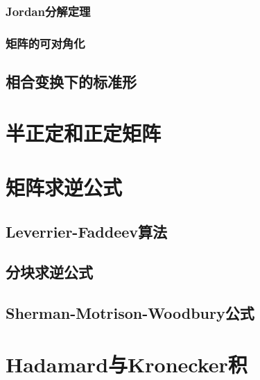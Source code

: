 \subsubsection{Jordan分解定理}
\label{ssub:jordanfen_jie_ding_li_}

\begin{definition}
\end{definition}

\subsubsection{矩阵的可对角化}
\label{ssub:ju_zhen_de_ke_dui_jiao_hua_}

\begin{definition}
\end{definition}

\subsection{相合变换下的标准形}
\label{sub:相合变换下的标准形}

\begin{definition}
\end{definition}

\section{半正定和正定矩阵}
\label{sec:半正定和正定矩阵}

\section{矩阵求逆公式}
\label{sec:矩阵求逆公式}

\subsection{Leverrier-Faddeev算法}
\label{sub:Leverrier-Faddeev算法}

\subsection{分块求逆公式}
\label{sub:分块求逆公式}

\subsection{Sherman-Motrison-Woodbury公式}
\label{sub:Sherman-Motrison-Woodbury公式}

\section{Hadamard与Kronecker积}
\label{sec:Hadamard与Kronecker积}

